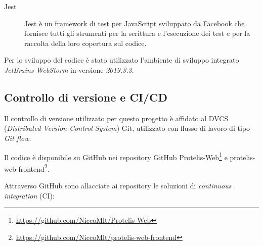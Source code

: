 \begin{description}
        \item[Jest]
          Jest è un framework di test per JavaScript sviluppato da Facebook che fornisce tutti gli strumenti per la scrittura e l'esecuzione dei test e per la raccolta della loro copertura sul codice.
      \end{description}

      Per lo sviluppo del codice è stato utilizzato l'ambiente di sviluppo integrato \emph{JetBrains WebStorm} in versione \emph{2019.3.3}.

  \subsection{Controllo di versione e CI/CD}
    Il controllo di versione utilizzato per questo progetto è affidato al DVCS (\emph{\emph{D}istributed \emph{V}ersion \emph{C}ontrol \emph{S}ystem}) Git, utilizzato con flusso di lavoro di tipo \emph{Git flow}.


    Il codice è disponibile su GitHub nei repository GitHub Protelis-Web\footnote{\url{https://github.com/NiccoMlt/Protelis-Web}}
    e protelis-web-frontend\footnote{\url{https://github.com/NiccoMlt/protelis-web-frontend}}.

    Attraverso GitHub sono allacciate ai repository le soluzioni di \emph{continuous integration} (CI):

